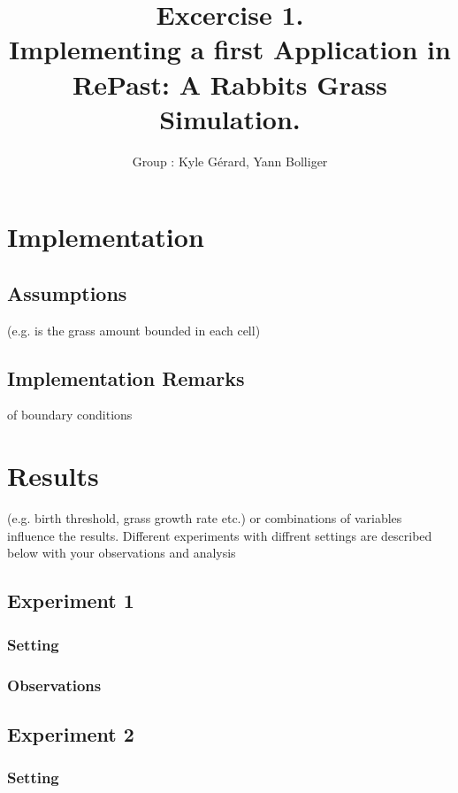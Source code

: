 \documentclass[11pt]{article}
\title{\bf Excercise 1.\\ Implementing a first Application in RePast: A Rabbits Grass Simulation.}
\author{Group \textnumero: Kyle Gérard, Yann Bolliger}
\begin{document}
\maketitle

\section{Implementation}

\subsection{Assumptions}
(e.g. is the grass amount bounded in each cell) %

\subsection{Implementation Remarks}
of boundary conditions %

\section{Results}
(e.g. birth threshold, grass growth rate etc.) or combinations of variables
influence the results. Different experiments with diffrent settings are
described below with your observations and analysis

\subsection{Experiment 1}

\subsubsection{Setting}

\subsubsection{Observations}

\subsection{Experiment 2}

\subsubsection{Setting}
\end{document}
